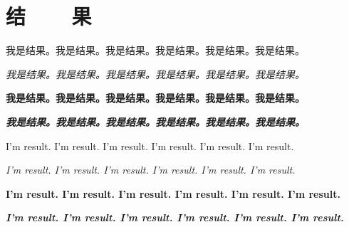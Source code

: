 \chapter{结~~~~果}


我是结果。我是结果。我是结果。我是结果。我是结果。我是结果。

\textit{我是结果。我是结果。我是结果。我是结果。我是结果。我是结果。}

\textbf{我是结果。我是结果。我是结果。我是结果。我是结果。我是结果。}

\textbf{\textit{我是结果。我是结果。我是结果。我是结果。我是结果。我是结果。}}

I'm result. I'm result. I'm result. I'm result. I'm result. I'm result. 

\textit{I'm result. I'm result. I'm result. I'm result. I'm result. I'm result. }

\textbf{I'm result. I'm result. I'm result. I'm result. I'm result. I'm result. }

\textbf{\textit{I'm result. I'm result. I'm result. I'm result. I'm result. I'm result. }}

\clearpage